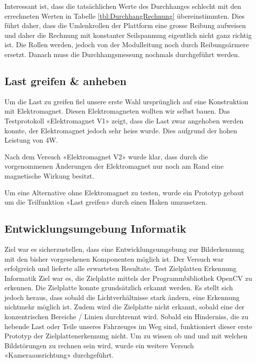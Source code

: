\documentclass[a4paper]{report}
\begin{document}
Interessant ist, dass die tatsächlichen Werte des Durchhanges schlecht mit den errechneten Werten in Tabelle \ref{tbl:DurchhangRechnung} übereinstimmten. Dies führt daher, dass die Umlenkrollen der Plattform eine grosse Reibung aufweisen und daher die Rechnung mit konstanter Seilspannung eigentlich nicht ganz richtig ist. Die Rollen werden, jedoch von der Modulleitung noch durch Reibungsärmere ersetzt. Danach muss die Durchhangsmessung nochmals durchgeführt werden.

\subsection{Last greifen \& anheben}
\label{ssec:VersLastg}
Um die Last zu greifen fiel unsere erste Wahl ursprünglich auf eine Konstruktion mit Elektromagnet. Diesen Elektromagneten wollten wir selbst bauen. Das Testprotokoll «Elektromagnet V1» zeigt, dass die Last zwar angehoben werden konnte, der Elektromagnet jedoch sehr heiss wurde. Dies aufgrund der hohen Leistung von 4W.

Nach dem Versuch «Elektromagnet V2» wurde klar, dass durch die vorgenommenen Änderungen der Elektromagnet nur noch am Rand eine magnetische Wirkung besitzt.

Um eine Alternative ohne Elektromagnet zu testen, wurde ein Prototyp gebaut um die Teilfunktion «Last greifen» durch einen Haken umzusetzen.


\subsection{Entwicklungsumgebung Informatik}
\label{ssec:VersEntI}
Ziel war es sicherzustellen, dass eine Entwicklungsumgebung zur Bilderkennung mit den bisher vorgesehenen Komponenten möglich ist. Der Versuch war erfolgreich und lieferte alle erwarteten Resultate.
Test Zielplatten Erkennung Informatik
Ziel war es, die Zielplatte mittels der Programmbibliothek OpenCV zu erkennen.
Die Zielplatte konnte grundsätzlich erkannt werden. Es stellt sich jedoch heraus, dass sobald die Lichtverhältnisse stark ändern, eine Erkennung nichtmehr möglich ist. Zudem wird die Zielplatte nicht erkannt, sobald eine der konzentrischen Bereiche / Linien durchtrennt wird. Sobald ein Hinderniss, die zu hebende Last oder Teile unseres Fahrzeuges im Weg sind, funktioniert dieser erste Prototyp der Zielplattenerkennung nicht.
Um zu wissen ob und und mit welchen Bildstörungen zu rechnen sein wird, wurde ein weitere Versuch «Kameraausrichtung» durchgeführt.
\end{document}
